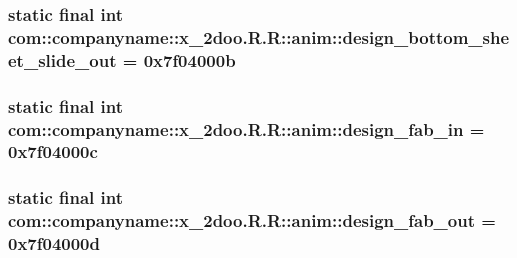 \hypertarget{classcom_1_1companyname_1_1x__2doo_1_1_r_1_1anim_351ee7255762f552b3920937b203b2cf}{
\subsubsection[{design\_\-bottom\_\-sheet\_\-slide\_\-out}]{\setlength{\rightskip}{0pt plus 5cm}static final int com::companyname::x\_\-2doo.R.R::anim::design\_\-bottom\_\-sheet\_\-slide\_\-out = 0x7f04000b}}
\label{classcom_1_1companyname_1_1x__2doo_1_1_r_1_1anim_351ee7255762f552b3920937b203b2cf}


\hypertarget{classcom_1_1companyname_1_1x__2doo_1_1_r_1_1anim_c6ed3c7aa0474b9ad3e4f5c407220468}{
\subsubsection[{design\_\-fab\_\-in}]{\setlength{\rightskip}{0pt plus 5cm}static final int com::companyname::x\_\-2doo.R.R::anim::design\_\-fab\_\-in = 0x7f04000c}}
\label{classcom_1_1companyname_1_1x__2doo_1_1_r_1_1anim_c6ed3c7aa0474b9ad3e4f5c407220468}


\hypertarget{classcom_1_1companyname_1_1x__2doo_1_1_r_1_1anim_5796f4473bc9aee41d8d8fb4fe0fa7a8}{
\subsubsection[{design\_\-fab\_\-out}]{\setlength{\rightskip}{0pt plus 5cm}static final int com::companyname::x\_\-2doo.R.R::anim::design\_\-fab\_\-out = 0x7f04000d}}
\label{classcom_1_1companyname_1_1x__2doo_1_1_r_1_1anim_5796f4473bc9aee41d8d8fb4fe0fa7a8}


